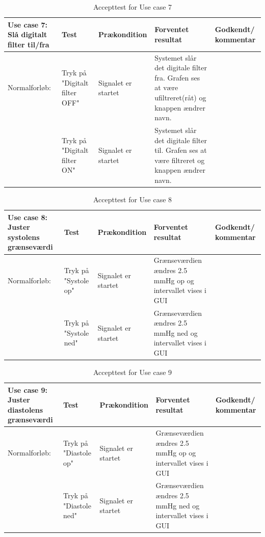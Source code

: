 \begin{table}[H]
\caption{Accepttest for Use case 7}\label{tab:tabel8}
\begin{tabular}{|>{\raggedright\arraybackslash}p{2.5cm}| >{\raggedright\arraybackslash}p{2.9cm} | >{\raggedright\arraybackslash}p{2.9cm} | >{\raggedright\arraybackslash}p{2.9cm} | >{\raggedright\arraybackslash}p{2.8cm} |}
   \hline
   \textbf{Use case 7: Slå digitalt filter til/fra} &\textbf{Test}& \textbf{Prækondition} & \textbf{Forventet resultat} & \textbf{Godkendt/ kommentar}\\ \hline
   Normalforløb:& Tryk på "Digitalt filter OFF" & Signalet er startet & Systemet slår det digitale filter fra. Grafen ses at være ufiltreret(råt) og knappen ændrer navn. &\\\hline
   &Tryk på "Digitalt filter ON" & Signalet er startet & Systemet slår det digitale filter til. Grafen ses at være filtreret og knappen ændrer navn. &\\\hline
\end{tabular}
\end{table}


\begin{table}[H]
\caption{Accepttest for Use case 8}\label{tab:tabel8}
\begin{tabular}{|>{\raggedright\arraybackslash}p{2.5cm}| >{\raggedright\arraybackslash}p{2.9cm} | >{\raggedright\arraybackslash}p{2.9cm} | >{\raggedright\arraybackslash}p{2.9cm} | >{\raggedright\arraybackslash}p{2.8cm} |}
   \hline
   \textbf{Use case 8: Juster systolens grænseværdi } &\textbf{Test}& \textbf{Prækondition} & \textbf{Forventet resultat} & \textbf{Godkendt/ kommentar}\\ \hline
   Normalforløb:& Tryk på "Systole op"& Signalet er startet & Grænseværdien ændres 2.5 mmHg op og intervallet vises i GUI &\\\hline
   &Tryk på "Systole ned" & Signalet er startet & Grænseværdien ændres 2.5 mmHg ned og intervallet vises i GUI & \\\hline
\end{tabular}
\end{table}

\begin{table}[H]
\caption{Accepttest for Use case 9}\label{tab:tabel8}
\begin{tabular}{|>{\raggedright\arraybackslash}p{2.5cm}| >{\raggedright\arraybackslash}p{2.9cm} | >{\raggedright\arraybackslash}p{2.9cm} | >{\raggedright\arraybackslash}p{2.9cm} | >{\raggedright\arraybackslash}p{2.8cm} |}
   \hline
   \textbf{Use case 9: Juster diastolens grænseværdi } &\textbf{Test}& \textbf{Prækondition} & \textbf{Forventet resultat} & \textbf{Godkendt/ kommentar}\\ \hline
   Normalforløb:& Tryk på "Diastole op"& Signalet er startet & Grænseværdien ændres 2.5 mmHg op og intervallet vises i GUI &\\\hline
   &Tryk på "Diastole ned" & Signalet er startet & Grænseværdien ændres 2.5 mmHg ned og intervallet vises i GUI & \\\hline
\end{tabular}
\end{table}

